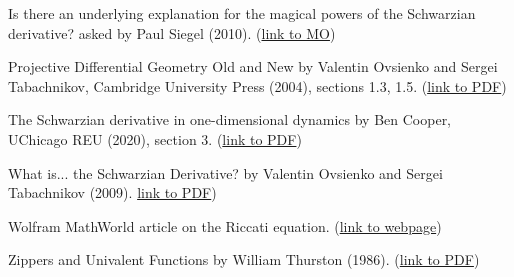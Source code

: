 \documentclass[11pt,leqno]{article}
\theoremstyle{plain}
\theoremstyle{definition}
\numberwithin{equation}{section}
\numberwithin{lem}{section}
\begin{document}
Is there an underlying explanation for the magical powers of the Schwarzian derivative? asked by Paul Siegel (2010). (\href{https://mathoverflow.net/questions/38105/is-there-an-underlying-explanation-for-the-magical-powers-of-the-schwarzian-deri}{link to MO})

Projective Differential Geometry Old and New by Valentin Ovsienko and Sergei Tabachnikov, Cambridge University Press (2004), sections 1.3, 1.5. (\href{https://drive.google.com/file/d/1pT7cxcGNZxCzmrkcY65SB-9dfruKkrSY/view?usp=share_link}{link to PDF})

The Schwarzian derivative in one-dimensional dynamics by Ben Cooper, UChicago REU (2020), section 3. (\href{https://math.uchicago.edu/~may/REU2020/REUPapers/Cooper.pdf}{link to PDF})

What is... the Schwarzian Derivative? by Valentin Ovsienko and Sergei Tabachnikov (2009). \href{https://www.ams.org/notices/200901/tx090100034p.pdf}{link to PDF})

Wolfram MathWorld article on the Riccati equation. (\href{https://mathworld.wolfram.com/RiccatiDifferentialEquation.html}{link to webpage})

Zippers and Univalent Functions by William Thurston (1986). (\href{https://people.math.harvard.edu/~ctm/home/text/others/thurston/zippers/zippers.pdf}{link to PDF})
\end{document}
